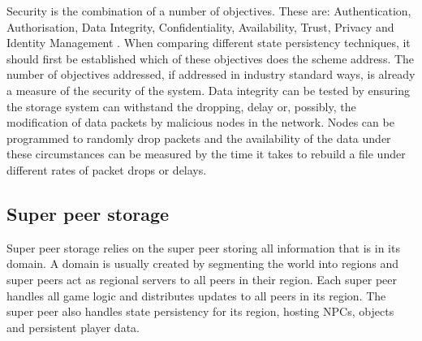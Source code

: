 \documentclass[10pt,a4paper,journal,cspaper,compsoc]{IEEEtran}
\begin{document}
Security is the combination of a number of objectives. These are: Authentication, Authorisation, Data Integrity, Confidentiality, Availability,
Trust, Privacy and Identity Management \cite{distributed_systems_security}. When comparing different state persistency techniques, it should first be
established which of these objectives does the scheme address. The number of objectives addressed, if addressed in industry standard ways, is already
a measure of the security of the system. Data integrity can be tested by ensuring the storage system can withstand the dropping, delay or, possibly,
the modification of data packets by malicious nodes in the network. Nodes can be programmed to randomly drop packets and the availability of the data
under these circumstances can be measured by the time it takes to rebuild a file under different rates of packet drops or delays.

\subsection{Super peer storage}
\label{super_peer_storage}

Super peer storage relies on the super peer storing all information that is in its domain. A domain is usually created by segmenting the world into
regions and super peers act as regional servers to all peers in their region. Each super peer handles all game logic and distributes updates to all
peers in its region. The super peer also handles state persistency for its region, hosting NPCs, objects and persistent player data.
\end{document}
